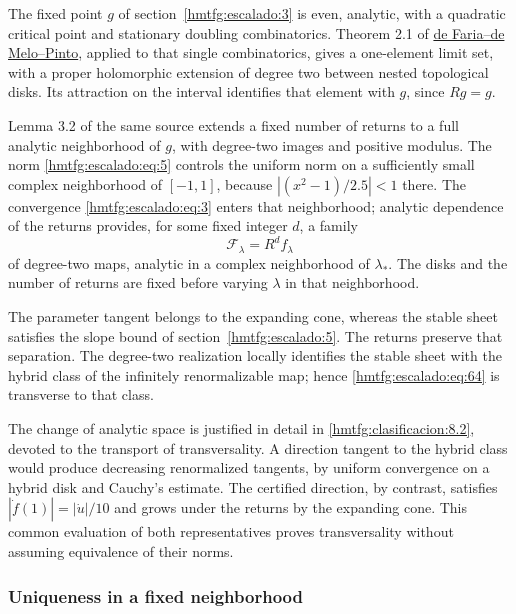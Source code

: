 The fixed point \(g\) of section~\ref{hmtfg:escalado:3} is even, analytic, with a quadratic critical point and stationary doubling combinatorics. Theorem 2.1 of \href{https://annals.math.princeton.edu/wp-content/uploads/annals-v164-n3-p01.pdf}{de Faria–de Melo–Pinto}, applied to that single combinatorics, gives a one-element limit set, with a proper holomorphic extension of degree two between nested topological disks. Its attraction on the interval identifies that element with \(g\), since \(Rg=g\).

Lemma 3.2 of the same source extends a fixed number of returns to a full analytic neighborhood of \(g\), with degree-two images and positive modulus. The norm \eqref{hmtfg:escalado:eq:5} controls the uniform norm on a sufficiently small complex neighborhood of \([-1,1]\), because \(|(x^2-1)/2.5|<1\) there. The convergence \eqref{hmtfg:escalado:eq:3} enters that neighborhood; analytic dependence of the returns provides, for some fixed integer \(d\), a family
\begin{equation}
\mathcal F_\lambda=R^d f_\lambda
\label{hmtfg:escalado:eq:64}
\end{equation}
of degree-two maps, analytic in a complex neighborhood of \(\lambda_*\). The disks and the number of returns are fixed before varying \(\lambda\) in that neighborhood.

The parameter tangent belongs to the expanding cone, whereas the stable sheet satisfies the slope bound of section~\ref{hmtfg:escalado:5}. The returns preserve that separation. The degree-two realization locally identifies the stable sheet with the hybrid class of the infinitely renormalizable map; hence \eqref{hmtfg:escalado:eq:64} is transverse to that class.

The change of analytic space is justified in detail in \ref{hmtfg:clasificacion:8.2}, devoted to the transport of transversality. A direction tangent to the hybrid class would produce decreasing renormalized tangents, by uniform convergence on a hybrid disk and Cauchy’s estimate. The certified direction, by contrast, satisfies \(|\dot f(1)|=|\dot u|/10\) and grows under the returns by the expanding cone. This common evaluation of both representatives proves transversality without assuming equivalence of their norms.

\subsubsection{Uniqueness in a fixed neighborhood}
\label{hmtfg:escalado:17.2}

